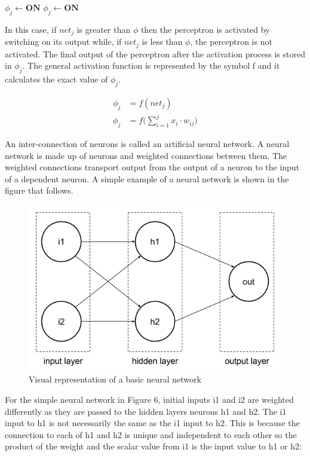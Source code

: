 \begin{algorithmic}
	\STATE $\phi_j \leftarrow \textbf{ON}$
	\ELSE
	\STATE $\phi_j \leftarrow \textbf{ON}$
	\ENDIF 
\end{algorithmic}

In this case, if $net_j$ is greater than $\phi$ then the perceptron is activated by switching on its output while, if $net_j$ is less than $\phi$, the perceptron is not activated. The final output of the perceptron after the activation process is stored in $\phi_j$. The general activation function is represented by the symbol f and it calculates the exact value of $\phi_j$.

\begin{align}
\phi_j &= f(net_j) \nonumber\\
\phi_j &= f\big(\sum_{i=1}^j x_i \cdot w_{ij} \big)
\end{align}

An inter-connection of neurons is called an artificial neural network. A neural network is made up of neurons and weighted connections between them. The weighted connections transport output from the output of a neuron to the input of a dependent neuron. A simple example of a neural network is shown in the figure that follows.

\begin{figure}[h]
	\centering
	\includegraphics[scale=0.6]{66}
	\caption{Visual representation of a basic neural network}
\end{figure}

For the simple neural network in Figure 6, initial inputs i1 and i2 are weighted differently as they are passed to the hidden layers neurons h1 and h2. The i1 input to h1 is not necessarily the same as the i1 input to h2. This is because the connection to each of h1 and h2 is unique and independent to each other so the product of the weight and the scalar value from i1 is the input value to h1 or h2:

